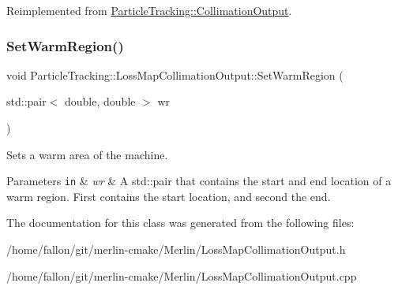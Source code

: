 Reimplemented from \hyperlink{classParticleTracking_1_1CollimationOutput}{Particle\+Tracking\+::\+Collimation\+Output}.

\mbox{\label{classParticleTracking_1_1LossMapCollimationOutput_a14471490bc642f45166fc024d7d80be9}} 
\subsubsection{\texorpdfstring{Set\+Warm\+Region()}{SetWarmRegion()}}
{\footnotesize\ttfamily void Particle\+Tracking\+::\+Loss\+Map\+Collimation\+Output\+::\+Set\+Warm\+Region (\begin{DoxyParamCaption}\item[{std\+::pair$<$ double, double $>$}]{wr }\end{DoxyParamCaption})}

Sets a warm area of the machine. 
\begin{DoxyParams}[1]{Parameters}
\mbox{\tt in}  & {\em wr} & A std\+::pair that contains the start and end location of a warm region. First contains the start location, and second the end. \\
\hline
\end{DoxyParams}


The documentation for this class was generated from the following files\+:\begin{DoxyCompactItemize}
\item 
/home/fallon/git/merlin-\/cmake/\+Merlin/Loss\+Map\+Collimation\+Output.\+h\item 
/home/fallon/git/merlin-\/cmake/\+Merlin/Loss\+Map\+Collimation\+Output.\+cpp\end{DoxyCompactItemize}
